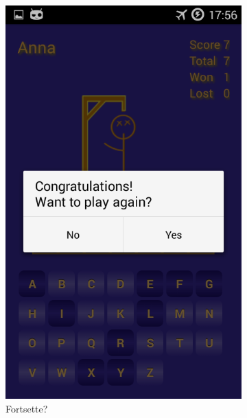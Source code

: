 \begin{figure}[ht]
    \centering
    \begin{subfigure}[b]{0.25\textwidth}
        \includegraphics[width=\textwidth]{./img/bruksanvisning/5.png}
        \caption{Fortsette?}
        \label{fig:fortsette}
    \end{subfigure}
    \begin{subfigure}[b]{0.25\textwidth}

\end{subfigure}
\end{figure}
